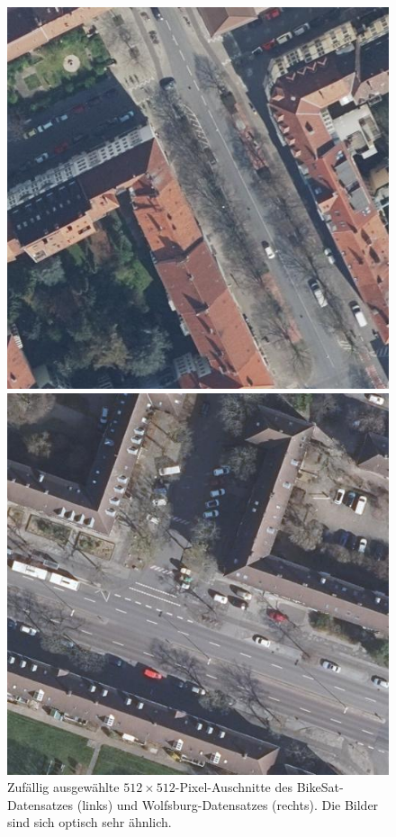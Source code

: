 \begin{figure}[h]
	\centering
	\begin{minipage}{.45\textwidth}
		\centering
		\includegraphics[width=.7\linewidth]{Bilder/comp-bikesat.png} 
	\end{minipage}
	\begin{minipage}{.45\textwidth}
		\centering
		\includegraphics[width=.7\linewidth]{Bilder/comp-wolfsburg.png} 
	\end{minipage}

	\caption{Zufällig ausgewählte $512{\times}512$-Pixel-Auschnitte des BikeSat-Datensatzes (links) 
	und Wolfsburg-Datensatzes (rechts). Die Bilder sind sich optisch sehr ähnlich.}
	\label{fig:comp-bikesat-wolfsburg}
\end{figure} 

